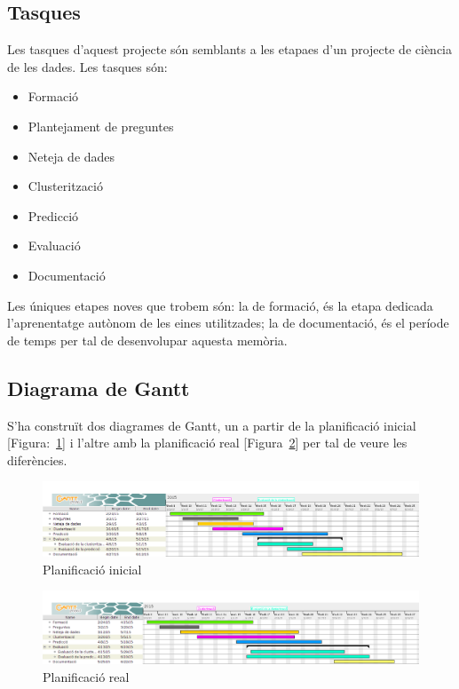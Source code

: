 \documentclass[12pt,a4paper,catalan]{article}
\begin{document}
\subsection{Tasques}
Les tasques d'aquest projecte són semblants a les etapaes d'un projecte de ciència de les dades. Les tasques són:
\begin{itemize}[leftmargin=.5in]
	\item Formació
	\item Plantejament de preguntes
	\item Neteja de dades
	\item Clusterització
	\item Predicció
	\item Evaluació
	\item Documentació
\end{itemize}

Les úniques etapes noves que trobem són: la de formació, és la etapa dedicada l'aprenentatge autònom de les eines utilitzades; la de documentació, és el període de temps per tal de desenvolupar aquesta memòria.

\newpage

\subsection{Diagrama de Gantt}
S'ha construït dos diagrames de Gantt, un a partir de la planificació inicial [Figura:~\ref{fig:planificacioinicial}] i l'altre amb la planificació real [Figura~\ref{fig:planificacioreal}] per tal de veure les diferències.

\begin{figure}[h]
\begin{center}
\includegraphics[width=\linewidth]{img/initialplanification.png}
\caption{Planificació inicial}
\label{fig:planificacioinicial}
\end{center}
\end{figure}


\begin{figure}[h]
\begin{center}
\includegraphics[width=\linewidth]{img/realplanification.png}
\caption{Planificació real}
\label{fig:planificacioreal}
\end{center}
\end{figure}
\end{document}
